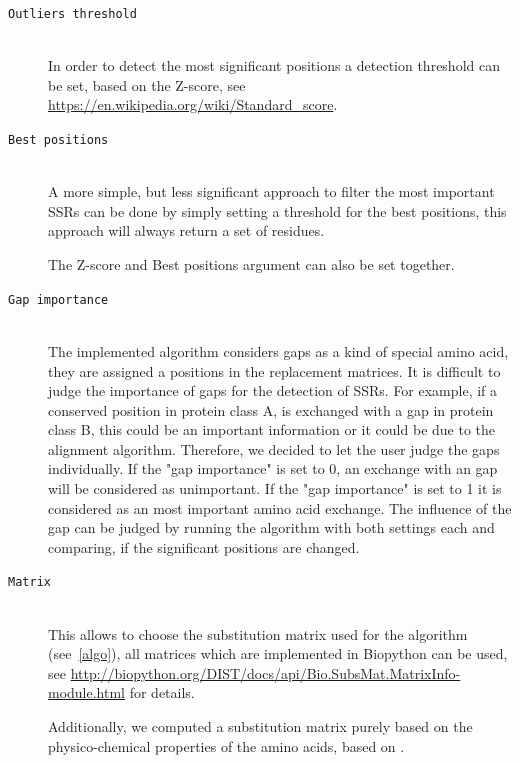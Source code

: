 \documentclass[a4paper,10pt]{article}
\begin{document}
\begin{description}

\item[\texttt{Outliers threshold}] \hfill \\

In order to detect the most significant positions a detection threshold can be set, based on the Z-score,
see \url{https://en.wikipedia.org/wiki/Standard_score}. 
 
\item[\texttt{Best positions}] \hfill \\

A more simple, but less significant approach to filter the most important SSRs can be done by simply setting a 
threshold for the best positions, this approach will always return a set of residues. 

The Z-score and Best positions argument can also be set together.

\item[\texttt{Gap importance}] \hfill \\

The implemented algorithm considers gaps as a kind of special amino acid, they are assigned a positions in the replacement matrices.
It is difficult to judge the importance of gaps for the detection of SSRs. For example, if a conserved position in protein class A, is 
exchanged with a gap in protein class B, this could be an important information or it could be due to the alignment algorithm.
Therefore, we decided to let the user judge the gaps individually. If the "gap importance" is set to 0, an exchange with an gap will be considered as
unimportant. If the "gap importance" is set to 1 it is considered as an most important amino acid exchange. The influence of the gap can be judged
by running the algorithm with both settings each and comparing, if the significant positions are changed.

\item[\texttt{Matrix}] \hfill \\

This allows to choose the substitution matrix used for the algorithm (see~\ref{algo}), all matrices which are implemented in Biopython can be used,
see \url{http://biopython.org/DIST/docs/api/Bio.SubsMat.MatrixInfo-module.html} for details. 

Additionally, we computed a substitution matrix purely based on the physico-chemical properties of the amino acids, 
based on \cite{chrysostomou_novel_2015}. 


\end{description}
\end{document}
